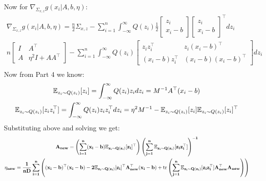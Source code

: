 \begin{enumerate}
\begin{soln}
    Now for $\nabla_{\Sigma_{x,z}} g(x_i|A,b,\eta)$:
    \begin{gather*}
        \nabla_{\Sigma_{x,z}} g(x_i|A,b,\eta) = \frac{n}{2}\Sigma_{x,z} - \sum_{i=1}^n\int_{-\infty}^{\infty}Q(z_i)\frac{1}{2}\left[\begin{array}{c} z_i \\ x_i-b \end{array} \right]\left[\begin{array}{c} z_i \\ x_i-b \end{array} \right]^\top dz_i \\
        n\left[ \begin{array}{cc} I & A^\top \\ A & \eta^2I + AA^\top \end{array} \right] - \sum_{i=1}^n\int_{-\infty}^{\infty}Q(z_i)\left[ \begin{array}{cc} z_iz_i^\top & z_i(x_i-b)^\top \\ (x_i-b)z_i^\top & (x_i-b)(x_i-b)^\top \end{array} \right] dz_i \\
    \end{gather*}
    Now from Part 4 we know:
    \begin{gather*}
        \mathbb E_{z_i \sim Q(z_i)}[z_i] = \int_{-\infty}^{\infty}Q(z_i)z_idz_i = M^{-1}A^\top(x_i-b)\\
        \mathbb E_{z_i \sim Q(z_i)}[z_iz_i^\top] = \int_{-\infty}^{\infty}Q(z_i)z_iz_i^\top dz_i = \eta^2M^{-1} - \mathbb E_{z_i \sim Q(z_i)}[z_i]\mathbb E_{z_i \sim Q(z_i)}[z_i]^\top
    \end{gather*}
    Substituting above and solving we get:
    \begin{gather*}
        \mathbf{A_{new} = \left(\sum_{i=1}^{n}(x_i - b)\mathbb E_{z_i \sim Q(z_i)}[z_i]^\top\right)\left(\sum_{j=1}^{n}\mathbb E_{z_i \sim Q(z_i)}[z_iz_i^\top]\right)^{-1}} \\
        \mathbf{\eta_{new} = \frac{1}{nD}\sum_{i=1}^{n}\left((x_i-b)^\top(x_i-b) - 2\mathbb E_{z_i \sim Q(z_i)}[z_i]^\top A_{new}^\top(x_i-b) + \text{tr}\left(\sum_{j=1}^{n}\mathbb E_{z_i \sim Q(z_i)}[z_iz_i^\top]A_{new}^\top A_{new}\right)\right)}
    \end{gather*}
\end{soln}



\end{enumerate}

